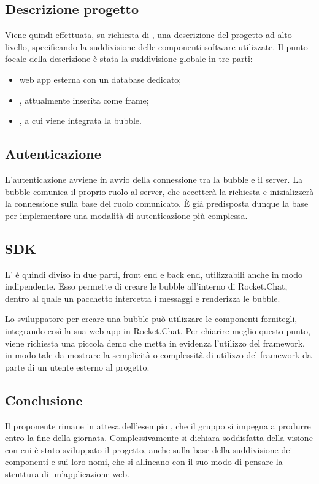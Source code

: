 \subsection{Descrizione progetto}
Viene quindi effettuata, su richiesta di \Proponente{}, una descrizione del progetto ad alto livello, specificando la suddivisione delle componenti software utilizzate. Il punto focale della descrizione è stata la suddivisione globale in tre parti:
\begin{itemize}
	\item web app esterna con un database dedicato;
	\item {}, attualmente inserita come frame;
	\item {}, a cui viene integrata la bubble.
\end{itemize}

\subsection{Autenticazione}
L'autenticazione avviene in avvio della connessione tra la bubble e il server. La bubble comunica il proprio ruolo al server, che accetterà la richiesta e inizializzerà la connessione sulla base del ruolo comunicato. È già predisposta dunque la base per implementare una modalità di autenticazione più complessa.

\subsection{SDK}
L' è quindi diviso in due parti, front end e back end, utilizzabili anche in modo indipendente. Esso permette di creare le bubble all'interno di Rocket.Chat, dentro al quale un pacchetto intercetta i messaggi e renderizza le bubble.

Lo sviluppatore per creare una bubble può utilizzare le componenti fornitegli, integrando così la sua web app in Rocket.Chat.
Per chiarire meglio questo punto, viene richiesta una piccola demo  che metta in evidenza l'utilizzo del framework, in modo tale da mostrare la semplicità o complessità di utilizzo del framework da parte di un utente esterno al progetto.

\subsection{Conclusione}
Il proponente rimane in attesa dell'esempio , che il gruppo si impegna a produrre entro la fine della giornata.
Complessivamente \Proponente{} si dichiara soddisfatta della visione con cui è stato sviluppato il progetto, anche sulla base della suddivisione dei componenti e sui loro nomi, che si allineano con il suo modo di pensare la struttura di un'applicazione web. 

\clearpage
